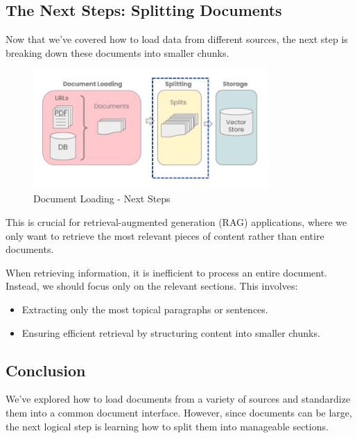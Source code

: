 \documentclass{article}
\begin{document}
\subsection{The Next Steps: Splitting Documents}

Now that we’ve covered how to load data from different sources, the next step is breaking down these documents into smaller chunks.

\begin{figure}[H]
    \centering
    \includegraphics[width=0.8\textwidth]{images/langchain_chat_with_your_data_004.png}
    \caption{Document Loading - Next Steps}
    \label{fig:document_loading_next_steps}
\end{figure}

This is crucial for retrieval-augmented generation (RAG) applications, where we only want to retrieve the most relevant pieces of content rather than entire documents.

When retrieving information, it is inefficient to process an entire document. Instead, we should focus only on the relevant sections. This involves:

\begin{itemize}
    \item Extracting only the most topical paragraphs or sentences.
    \item Ensuring efficient retrieval by structuring content into smaller chunks.
\end{itemize}

\subsection{Conclusion}

We've explored how to load documents from a variety of sources and standardize them into a common document interface. However, since documents can be large, the next logical step is learning how to split them into manageable sections.
\end{document}

